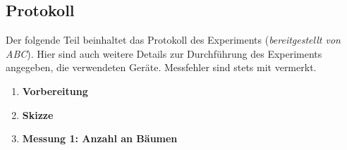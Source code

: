 \newenvironment{preface}{\thispagestyle{empty}\vspace*{\fill}\small}{\vspace*{\fill}}


\begin{preface}
    \begin{center}

        \section{Protokoll}\label{sec:protocol}
        Der folgende Teil beinhaltet das Protokoll des Experiments (\textit{bereitgestellt von ABC}). Hier sind auch weitere Details zur Durchführung des Experiments angegeben, \zB die verwendeten Geräte. Messfehler sind stets mit vermerkt.

        \begin{enumerate}[label=\textbf{\arabic*}]
            \item \textbf{Vorbereitung}
            \item \textbf{Skizze}
            \item \textbf{Messung 1: Anzahl an Bäumen}
        \end{enumerate}

    \end{center}
\end{preface}


